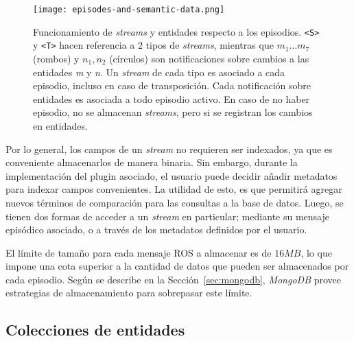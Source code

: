 \begin{figure}[!ht]
	\centering
	\texttt{[image: episodes-and-semantic-data.png]}
	\caption[Funcionamiento de \textit{streams} y entidades respecto a los episodios.]
	{\small Funcionamiento de \textit{streams} y entidades respecto a los episodios. \texttt{\textless S\textgreater} y \texttt{\textless T\textgreater} hacen referencia a 2 tipos de \textit{streams}, mientras que \texttt{$m_1\ldots m_7$} (rombos) y \texttt{$n_1, n_2$} (círculos) son notificaciones sobre cambios a las entidades \textit{m} y \textit{n}. Un \textit{stream} de cada tipo es asociado a cada episodio, incluso en caso de transposición. Cada notificación sobre entidades es asociada a todo episodio activo. En caso de no haber episodio, no se almacenan \textit{streams}, pero si se registran los cambios en entidades.}
	\label{img:episodes-and-semantic-data}
	\end{figure}


Por lo general, los campos de un \textit{stream} no requieren ser indexados, ya que es conveniente almacenarlos de manera binaria. Sin embargo, durante la implementación del plugin asociado, el usuario puede decidir añadir metadatos para indexar campos convenientes. La utilidad de esto, es que permitirá agregar nuevos términos de comparación para las consultas a la base de datos. Luego, se tienen dos formas de acceder a un \textit{stream} en particular; mediante su mensaje episódico asociado, o a través de los metadatos definidos por el usuario.

El límite de tamaño para cada mensaje ROS a almacenar es de $16 MB$, lo que impone una cota superior a la cantidad de datos que pueden ser almacenados por cada episodio. Según se describe en la Sección~\ref{sec:mongodb}, \textit{MongoDB} provee estrategias de almacenamiento para sobrepasar este límite.



\subsection{Colecciones de entidades}

